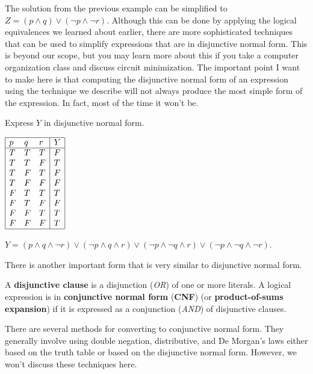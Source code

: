 The solution from the previous example can be simplified to 
$Z=(p\wedge q)\vee (\neg p\wedge \neg r)$.
Although this can be done by applying the logical equivalences
we learned about earlier, there are more sophisticated techniques
that can be used to simplify expressions that are in disjunctive normal form.
This is beyond our scope, but you may learn more about this if you
take a computer organization class and discuss circuit minimization.
The important point I want to make here is that computing the disjunctive normal form
of an expression using the technique we describe will not always produce the
most simple form of the expression.  In fact, most of the time it won't be.

\begin{exer}
Express $Y$ in disjunctive normal form.

$\begin{array}{|lll|l|}
\hline
p & q & r & Y \\
\hline
T & T & T & F \\
T & T & F & T \\
T & F & T & F \\
T & F & F & F \\
F & T & T & T \\
F & T & F & F \\
F & F & T & T \\
F & F & F & T \\
\hline
\end{array}$
\begin{answer} 
$Y=
(p\wedge q \wedge \neg r) \vee
(\neg p\wedge q \wedge r) \vee
(\neg p\wedge \neg q \wedge r) \vee
(\neg p\wedge \neg q \wedge \neg r)$.
\end{answer}
\end{exer}

There is another important form that is very similar to disjunctive normal form.

\begin{df}
A {\bf disjunctive clause} is a disjunction ({\em OR}) of one or more literals.
A logical expression is in {\bf conjunctive normal form} ({\bf CNF})
(or {\bf product-of-sums expansion})
if it is expressed as a conjunction ({\em AND}) of disjunctive clauses.
\end{df}

There are several methods for converting to conjunctive normal form.
They generally involve using double negation, distributive, and De Morgan's laws
either based on the truth table or based on the disjunctive normal form.
However, we won't discuss these techniques here.  

